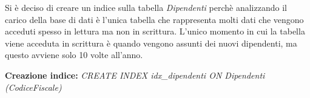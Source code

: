 Si è deciso di creare un indice sulla tabella \emph{Dipendenti} perchè analizzando il carico della base di dati è l'unica tabella che rappresenta molti dati che vengono acceduti spesso in lettura ma non in scrittura. L'unico momento in cui la tabella viene acceduta in scrittura è quando vengono assunti dei nuovi dipendenti, ma questo avviene solo 10 volte all'anno.\\

\begin{flushleft}
	\textbf{{Creazione indice:}} \emph{CREATE INDEX idx\_dipendenti ON Dipendenti (CodiceFiscale)}
\end{flushleft}

\begin{minipage}{6cm}
\end{minipage}
\hspace{2mm}
\begin{minipage}{6cm}
\end{minipage}